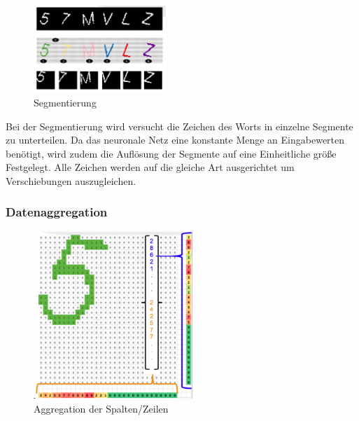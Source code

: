   \begin{figure}
  \vspace{-35pt}
  \begin{center}
    \includegraphics[width=5cm]{res/Segmentierung.png}
  \end{center}
  \vspace{-5pt}
  \caption{Segmentierung}
  \vspace{-10pt}
\end{figure}


Bei der Segmentierung wird versucht die Zeichen des Worts in einzelne Segmente
zu unterteilen. Da das neuronale Netz eine konstante Menge an Eingabewerten
benötigt, wird zudem die Auflösung der Segmente auf eine Einheitliche größe
Festgelegt. Alle Zeichen werden auf die gleiche Art ausgerichtet um
Verschiebungen auszugleichen.

\subsubsection{Datenaggregation}

\begin{figure}
  \begin{center}
    \includegraphics[width=6cm]{res/Aggregation.png}
  \end{center}
  \vspace{-5pt}
  \caption{Aggregation der Spalten/Zeilen}
  \vspace{-10pt}
\end{figure}


